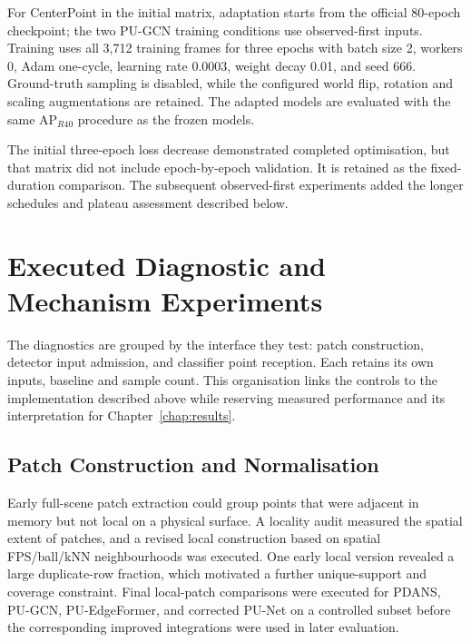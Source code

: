 For CenterPoint in the initial matrix, adaptation starts from the official 80-epoch checkpoint; the two PU-GCN training conditions use observed-first inputs. Training uses all 3,712 training frames for three epochs with batch size 2, workers 0, Adam one-cycle, learning rate 0.0003, weight decay 0.01, and seed 666. Ground-truth sampling is disabled, while the configured world flip, rotation and scaling augmentations are retained. The adapted models are evaluated with the same AP$_{R40}$ procedure as the frozen models.

The initial three-epoch loss decrease demonstrated completed optimisation, but that matrix did not include epoch-by-epoch validation. It is retained as the fixed-duration comparison. The subsequent observed-first experiments added the longer schedules and plateau assessment described below.



\FloatBarrier

\section{Executed Diagnostic and Mechanism Experiments}
\label{sec:fc-4-12}

The diagnostics are grouped by the interface they test: patch
construction, detector input admission, and classifier point
reception. Each retains its own inputs, baseline and sample count.
This organisation links the controls to the implementation described
above while reserving measured performance and its interpretation for
Chapter~\ref{chap:results}.

\subsection{Patch Construction and Normalisation}
\label{sec:fc-4-12-1}

Early full-scene patch extraction could group points that were adjacent in memory but not local on a physical surface. A locality audit measured the spatial extent of patches, and a revised local construction based on spatial FPS/ball/kNN neighbourhoods was executed. One early local version revealed a large duplicate-row fraction, which motivated a further unique-support and coverage constraint. Final local-patch comparisons were executed for PDANS, PU-GCN, PU-EdgeFormer, and corrected PU-Net on a controlled subset before the corresponding improved integrations were used in later evaluation.

